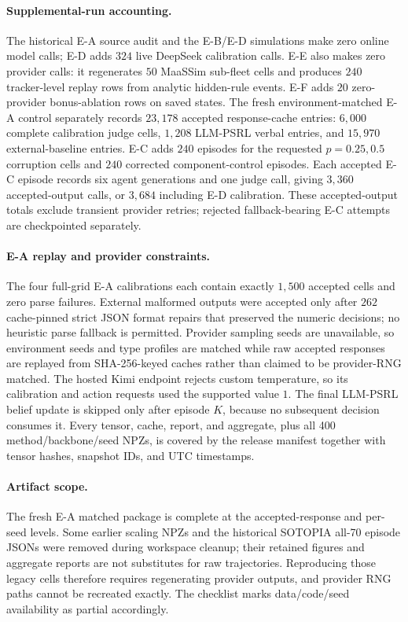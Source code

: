 \paragraph{Supplemental-run accounting.} The historical E-A source audit and the E-B/E-D simulations make zero online model calls; E-D adds $324$ live DeepSeek calibration calls. E-E also makes zero provider calls: it regenerates $50$ MaaSSim sub-fleet cells and produces $240$ tracker-level replay rows from analytic hidden-rule events. E-F adds $20$ zero-provider bonus-ablation rows on saved states. The fresh environment-matched E-A control separately records $23{,}178$ accepted response-cache entries: $6{,}000$ complete calibration judge cells, $1{,}208$ LLM-PSRL verbal entries, and $15{,}970$ external-baseline entries. E-C adds $240$ episodes for the requested $p{=}0.25,0.5$ corruption cells and $240$ corrected component-control episodes. Each accepted E-C episode records six agent generations and one judge call, giving $3{,}360$ accepted-output calls, or $3{,}684$ including E-D calibration. These accepted-output totals exclude transient provider retries; rejected fallback-bearing E-C attempts are checkpointed separately.

\paragraph{E-A replay and provider constraints.} The four full-grid E-A calibrations each contain exactly $1{,}500$ accepted cells and zero parse failures. External malformed outputs were accepted only after $262$ cache-pinned strict JSON format repairs that preserved the numeric decisions; no heuristic parse fallback is permitted. Provider sampling seeds are unavailable, so environment seeds and type profiles are matched while raw accepted responses are replayed from SHA-256-keyed caches rather than claimed to be provider-RNG matched. The hosted Kimi endpoint rejects custom temperature, so its calibration and action requests used the supported value $1$. The final LLM-PSRL belief update is skipped only after episode $K$, because no subsequent decision consumes it. Every tensor, cache, report, and aggregate, plus all 400 method/backbone/seed NPZs, is covered by the release manifest together with tensor hashes, snapshot IDs, and UTC timestamps.

\paragraph{Artifact scope.} The fresh E-A matched package is complete at the accepted-response and per-seed levels. Some earlier scaling NPZs and the historical SOTOPIA all-70 episode JSONs were removed during workspace cleanup; their retained figures and aggregate reports are not substitutes for raw trajectories. Reproducing those legacy cells therefore requires regenerating provider outputs, and provider RNG paths cannot be recreated exactly. The checklist marks data/code/seed availability as partial accordingly.


